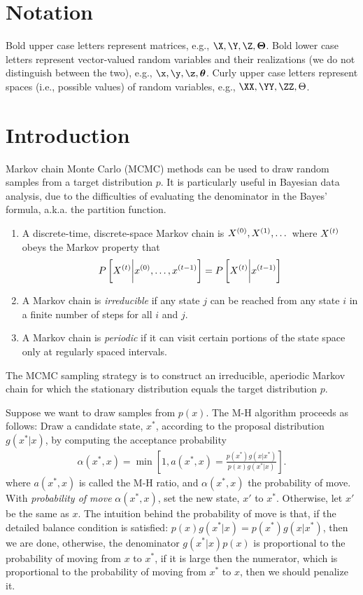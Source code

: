 \documentclass{book}
\begin{document}
\section{Notation}
Bold upper case letters represent matrices, e.g., $\X, \Y, \Z, \bTheta$. Bold lower case letters represent vector-valued random variables and their realizations (we do not distinguish between the two), e.g., $\x, \y, \z, \btheta$. Curly upper case letters represent spaces (i.e., possible values) of random variables, e.g., $\XX, \YY, \ZZ, \Theta$.

\section{Introduction}
Markov chain Monte Carlo (MCMC) methods can be used to draw random samples from a target distribution $p$. It is particularly useful in Bayesian data analysis, due to the difficulties of evaluating the denominator in the Bayes' formula, a.k.a. the partition function.

\begin{enumerate}
\item A discrete-time, discrete-space Markov chain is ${X}^{(0)}, {X}^{(1)}, \dots$ where ${X}^{(t)}$ obeys the Markov property that
\begin{align}
P\left[{X}^{(t)} \bigg| {x}^{(0)},\dots,{x}^{(t-1)}\right] = P\left[{X}^{(t)} \bigg| {x}^{(t-1)} \right]
\end{align}
\item A Markov chain is {\em{irreducible}} if any state $j$ can be reached from any state $i$ in a finite number of steps for all $i$ and $j$.
\item A Markov chain is {\em{periodic}} if it can visit certain portions of the state space only at regularly spaced intervals.
\end{enumerate}

The MCMC sampling strategy is to construct an irreducible, aperiodic Markov chain for which the stationary distribution equals the target distribution $p$.

Suppose we want to draw samples from $p(x)$. The M-H algorithm proceeds as follows: Draw a candidate state, $x^*$, according to the proposal distribution $g(x^*|x)$, by computing the acceptance probability
\begin{align}
\alpha(x^*, x) = \min\left[1, a(x^*,x) = \frac{p(x^*)g(x|x^*)}{p(x)g(x^*|x)}\right].
\end{align}
where $a(x^*,x)$ is called the M-H ratio, and $\alpha(x^*,x)$ the probability of move. With {\em{probability of move}} $\alpha(x^*, x)$, set the new state, $x'$ to $x^*$. Otherwise, let $x'$ be the same as $x$. The intuition behind the probability of move is that, if the detailed balance condition is satisfied: $p(x)g(x^*|x) = p(x^*)g(x|x^*)$, then we are done, otherwise, the denominator $g(x^*|x)p(x)$ is proportional to the probability of moving from $x$ to $x^*$, if it is large then the numerator, which is proportional to the probability of moving from $x^*$ to $x$, then we should penalize it.
\end{document}
